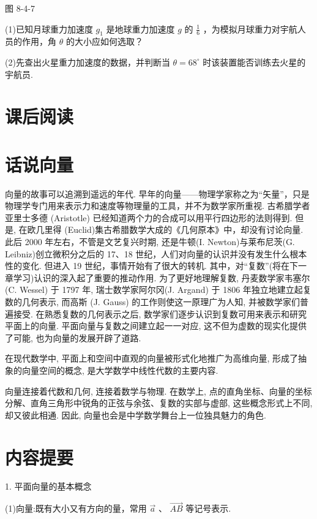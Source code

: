 \documentclass[10pt]{article}
\begin{document}
图 8-4-7

(1)已知月球重力加速度 \({g}_{1}\) 是地球重力加速度 \(g\) 的 \(\frac{1}{6}\) ，为模拟月球重力对宇航人员的作用，角 \(\theta\) 的大小应如何选取？

(2)先查出火星重力加速度的数据，并判断当 \(\theta  = {68}^{ \circ  }\) 时该装置能否训练去火星的宇航员.

\section*{课后阅读}

\section*{话说向量}

向量的故事可以追溯到遥远的年代. 早年的向量——物理学家称之为“矢量”，只是物理学专门用来表示力和速度等物理量的工具，并不为数学家所重视. 古希腊学者亚里士多德 (Aristotle) 已经知道两个力的合成可以用平行四边形的法则得到. 但是, 在欧几里得 (Euclid)集古希腊数学大成的《几何原本》中，却没有讨论向量. 此后 2000 年左右，不管是文艺复兴时期, 还是牛顿(I. Newton)与莱布尼茨(G. Leibniz)创立微积分之后的 17、18 世纪，人们对向量的认识并没有发生什么根本性的变化. 但进入 19 世纪，事情开始有了很大的转机. 其中，对“复数”(将在下一章学习)认识的深入起了重要的推动作用. 为了更好地理解复数, 丹麦数学家韦塞尔(C. Wessel) 于 1797 年, 瑞士数学家阿尔冈(J. Argand) 于 1806 年独立地建立起复数的几何表示, 而高斯 (J. Gauss) 的工作则使这一原理广为人知, 并被数学家们普遍接受. 在熟悉复数的几何表示之后, 数学家们逐步认识到复数可用来表示和研究平面上的向量. 平面向量与复数之间建立起一一对应, 这不但为虚数的现实化提供了可能, 也为向量的发展开辟了道路.

在现代数学中, 平面上和空间中直观的向量被形式化地推广为高维向量, 形成了抽象的向量空间的概念, 是大学数学中线性代数的主要内容.

向量连接着代数和几何, 连接着数学与物理. 在数学上, 点的直角坐标、向量的坐标分解、直角三角形中锐角的正弦与余弦、复数的实部与虚部, 这些概念形式上不同, 却又彼此相通. 因此, 向量也会是中学数学舞台上一位独具魅力的角色.

\section*{内容提要}

1. 平面向量的基本概念

(1)向量:既有大小又有方向的量，常用 \(\overrightarrow{a}\) 、 \(\overrightarrow{AB}\) 等记号表示.
\end{document}
